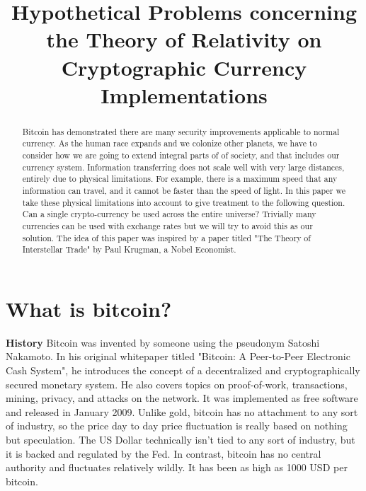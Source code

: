 \documentclass[conference]{IEEEtran}
\begin{document}
\title{Hypothetical Problems concerning the Theory of Relativity on Cryptographic Currency Implementations}
\author
{
}
\maketitle

\begin{abstract}
Bitcoin has demonstrated there are many security improvements applicable to normal currency. As the human race expands and we colonize other planets, we have to consider how we are going to extend integral parts of of society, and that includes our currency system. Information transferring does not scale well with very large distances, entirely due to physical limitations. For example, there is a maximum speed that any information can travel, and it cannot be faster than the speed of light. In this paper we take these physical limitations into account to give treatment to the following question. Can a single crypto-currency be used across the entire universe? Trivially many currencies can be used with exchange rates but we will try to avoid this as our solution. The idea of this paper was inspired by a paper titled "The Theory of Interstellar Trade" by Paul Krugman, a Nobel Economist. \cite{krugman}
\end{abstract}

\section{What is bitcoin?}
\textbf{History} Bitcoin was invented by someone using the pseudonym Satoshi Nakamoto. In his original whitepaper  \cite{nakamoto} titled "Bitcoin: A Peer-to-Peer Electronic Cash System", he introduces the concept of a decentralized and cryptographically secured monetary system. He also covers topics on proof-of-work, transactions, mining, privacy, and attacks on the network. It was implemented as free software and released in January 2009. Unlike gold, bitcoin has no attachment to any sort of industry, so the price day to day price fluctuation is really based on nothing but speculation. The US Dollar technically isn't tied to any sort of industry, but it is backed and regulated by the Fed. In contrast, bitcoin has no central authority and fluctuates relatively wildly. It has been as high as 1000 USD per bitcoin.\cite{1000usd}
\end{document}
